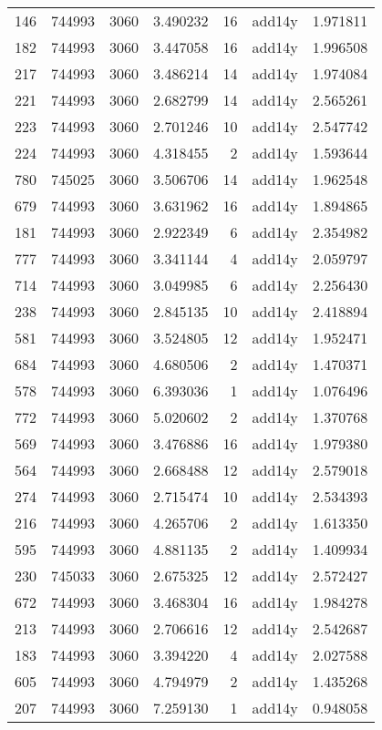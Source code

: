 \begin{tabular}{lrrrrlr}
146 & 744993 & 3060 & 3.490232 & 16 & add14y & 1.971811 \\
182 & 744993 & 3060 & 3.447058 & 16 & add14y & 1.996508 \\
217 & 744993 & 3060 & 3.486214 & 14 & add14y & 1.974084 \\
221 & 744993 & 3060 & 2.682799 & 14 & add14y & 2.565261 \\
223 & 744993 & 3060 & 2.701246 & 10 & add14y & 2.547742 \\
224 & 744993 & 3060 & 4.318455 & 2 & add14y & 1.593644 \\
780 & 745025 & 3060 & 3.506706 & 14 & add14y & 1.962548 \\
679 & 744993 & 3060 & 3.631962 & 16 & add14y & 1.894865 \\
181 & 744993 & 3060 & 2.922349 & 6 & add14y & 2.354982 \\
777 & 744993 & 3060 & 3.341144 & 4 & add14y & 2.059797 \\
714 & 744993 & 3060 & 3.049985 & 6 & add14y & 2.256430 \\
238 & 744993 & 3060 & 2.845135 & 10 & add14y & 2.418894 \\
581 & 744993 & 3060 & 3.524805 & 12 & add14y & 1.952471 \\
684 & 744993 & 3060 & 4.680506 & 2 & add14y & 1.470371 \\
578 & 744993 & 3060 & 6.393036 & 1 & add14y & 1.076496 \\
772 & 744993 & 3060 & 5.020602 & 2 & add14y & 1.370768 \\
569 & 744993 & 3060 & 3.476886 & 16 & add14y & 1.979380 \\
564 & 744993 & 3060 & 2.668488 & 12 & add14y & 2.579018 \\
274 & 744993 & 3060 & 2.715474 & 10 & add14y & 2.534393 \\
216 & 744993 & 3060 & 4.265706 & 2 & add14y & 1.613350 \\
595 & 744993 & 3060 & 4.881135 & 2 & add14y & 1.409934 \\
230 & 745033 & 3060 & 2.675325 & 12 & add14y & 2.572427 \\
672 & 744993 & 3060 & 3.468304 & 16 & add14y & 1.984278 \\
213 & 744993 & 3060 & 2.706616 & 12 & add14y & 2.542687 \\
183 & 744993 & 3060 & 3.394220 & 4 & add14y & 2.027588 \\
605 & 744993 & 3060 & 4.794979 & 2 & add14y & 1.435268 \\
207 & 744993 & 3060 & 7.259130 & 1 & add14y & 0.948058 \\

\end{tabular}

